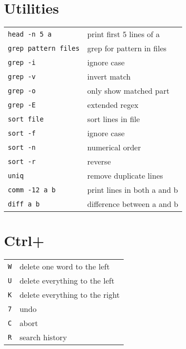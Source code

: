 \documentclass[a4paper, twocolumn]{article}
\renewcommand{\tt}{\texttt}
\begin{document}
\section{Utilities}
\begin{tabular}{ll}
    \tt{head -n 5 a}        & print first 5 lines of a              \\
    \tt{grep pattern files} & grep for pattern in files             \\
    \tt{grep -i}            & ignore case                           \\
    \tt{grep -v}            & invert match                          \\
    \tt{grep -o}            & only show matched part                \\
    \tt{grep -E}            & extended regex                        \\
    \tt{sort file}          & sort lines in file                    \\
    \tt{sort -f}            & ignore case                           \\
    \tt{sort -n}            & numerical order                       \\
    \tt{sort -r}            & reverse                               \\
    \tt{uniq}               & remove duplicate lines                \\
    \tt{comm -12 a b}       & print lines in both a and b           \\
    \tt{diff a b}           & difference between a and b
\end{tabular}

\section{Ctrl+}
\begin{tabular}{ll}
    \tt{W} & delete one word to the left                           \\
    \tt{U} & delete everything to the left                         \\
    \tt{K} & delete everything to the right                        \\
    \tt{7} & undo                                                  \\
    \tt{C} & abort                                                 \\
    \tt{R} & search history
\end{tabular}
\end{document}
